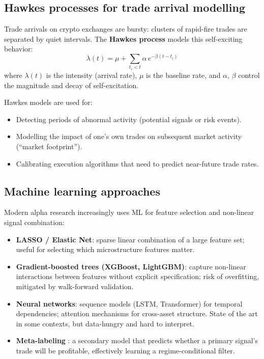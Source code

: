 \documentclass[11pt,a4paper]{article}
\begin{document}
\subsection{Hawkes processes for trade arrival modelling}

Trade arrivals on crypto exchanges are bursty: clusters of rapid-fire
trades are separated by quiet intervals. The \textbf{Hawkes process}
models this self-exciting behavior:
\begin{equation}
  \lambda(t) = \mu + \sum_{t_i < t} \alpha\, e^{-\beta(t - t_i)}
\end{equation}
where $\lambda(t)$ is the intensity (arrival rate), $\mu$ is the
baseline rate, and $\alpha$, $\beta$ control the magnitude and decay
of self-excitation.

Hawkes models are used for:
\begin{itemize}[leftmargin=1.5em]
  \item Detecting periods of abnormal activity (potential signals or
        risk events).
  \item Modelling the impact of one's own trades on subsequent market
        activity (``market footprint'').
  \item Calibrating execution algorithms that need to predict
        near-future trade rates.
\end{itemize}

\subsection{Machine learning approaches}

Modern alpha research increasingly uses ML for feature selection and
non-linear signal combination:
\begin{itemize}[leftmargin=1.5em]
  \item \textbf{LASSO / Elastic Net}: sparse linear combination of a
        large feature set; useful for selecting which microstructure
        features matter.
  \item \textbf{Gradient-boosted trees (XGBoost, LightGBM)}: capture
        non-linear interactions between features without explicit
        specification; risk of overfitting, mitigated by walk-forward
        validation.
  \item \textbf{Neural networks}: sequence models (LSTM, Transformer)
        for temporal dependencies; attention mechanisms for
        cross-asset structure. State of the art in some contexts,
        but data-hungry and hard to interpret.
  \item \textbf{Meta-labeling} \citep{deprado2018advances}: a
        secondary model that predicts whether a primary signal's
        trade will be profitable, effectively learning a
        regime-conditional filter.
\end{itemize}
\end{document}
